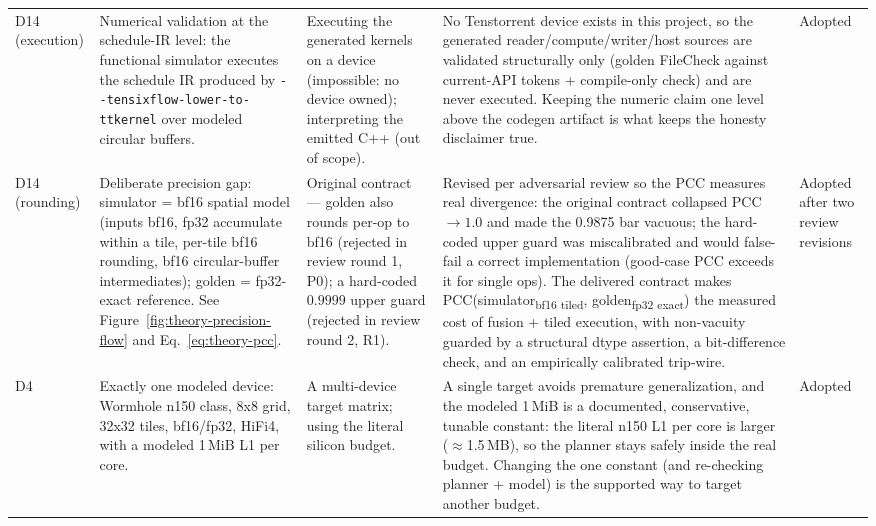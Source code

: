 {\begin{longtable}{@{}p{1.1cm}p{3.55cm}p{2.9cm}p{4.75cm}p{1.5cm}@{}}
D14 (execution)
& Numerical validation at the schedule-IR level: the functional simulator executes
  the schedule IR produced by \texttt{-{}-tensixflow-lower-to-ttkernel} over
  modeled circular buffers.
& Executing the generated kernels on a device (impossible: no device owned);
  interpreting the emitted C++ (out of scope).
& No Tenstorrent device exists in this project, so the generated
  reader/compute/writer/host sources are validated structurally only (golden
  FileCheck against current-API tokens + compile-only check) and are never
  executed. Keeping the numeric claim one level above the codegen artifact is what
  keeps the honesty disclaimer true.
& Adopted \\

D14 (rounding)
& Deliberate precision gap: simulator = bf16 spatial model (inputs bf16, fp32
  accumulate within a tile, per-tile bf16 rounding, bf16 circular-buffer
  intermediates); golden = fp32-exact reference. See
  Figure~\ref{fig:theory-precision-flow} and Eq.~\eqref{eq:theory-pcc}.
& Original contract --- golden also rounds per-op to bf16 (rejected in review
  round 1, P0); a hard-coded $0.9999$ upper guard (rejected in review round 2,
  R1).
& Revised per adversarial review so the PCC measures real divergence: the original
  contract collapsed PCC $\to 1.0$ and made the 0.9875 bar vacuous; the hard-coded
  upper guard was miscalibrated and would false-fail a correct implementation
  (good-case PCC exceeds it for single ops). The delivered contract makes
  PCC(simulator\textsubscript{bf16 tiled}, golden\textsubscript{fp32 exact}) the
  measured cost of fusion + tiled execution, with non-vacuity guarded by a
  structural dtype assertion, a bit-difference check, and an empirically calibrated
  trip-wire.
& Adopted after two review revisions \\

D4
& Exactly one modeled device: Wormhole n150 class, 8x8 grid, 32x32 tiles,
  bf16/fp32, HiFi4, with a modeled 1\,MiB L1 per core.
& A multi-device target matrix; using the literal silicon budget.
& A single target avoids premature generalization, and the modeled 1\,MiB is a
  documented, conservative, tunable constant: the literal n150 L1 per core is
  larger ($\approx$1.5\,MB), so the planner stays safely inside the real budget.
  Changing the one constant (and re-checking planner + model) is the supported way
  to target another budget.
& Adopted \\


\end{longtable}}
